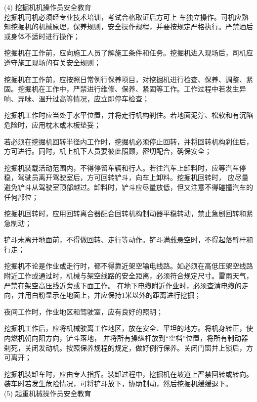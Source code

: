 (4) 挖掘机机操作员安全教育\\

 挖掘机司机必须经专业技术培训，考试合格取证后方可上
车独立操作。司机应熟知挖掘机的机械原理，保养规则，安全操作规程，并要按规定严格执行。严禁酒后或身体不适时进行操作；

 挖掘机在工作前，应向施工人员了解施工条件和任务。挖掘机进入现场后，司机应遵守施工现场的有关安全规则；

 挖掘机在工作前，应按照日常例行保养项目，对挖掘机进行检查、保养、调整、紧固。挖掘机在工作中，严禁进行维修、保养、紧固等工作。工作过程中若发生异响、异味、温升过高等情况，应立即停车检查；

 挖掘机工作时应当处于水平位置，并将走行机构刹住。若地面泥泞、松软和有沉陷危险时，应用枕木或木板垫妥；

 若必须在挖掘机回转半径内工作时，挖掘机必须停止回转，并将回转机构刹住后，方可进行。同时，机上机下人员要彼此照顾，密切配合，确保安全；

 挖掘机装载活动范围内，不得停留车辆和行人。若往汽车上卸料时，应等汽车停稳，驾驶员离开驾驶室后，方可回转铲斗，向车上卸料。挖掘机回转时，
应尽量避免铲斗从驾驶室顶部越过。卸料时，铲斗应尽量放低，但又注意不得碰撞汽车的任何部位；

 挖掘机回转时，应用回转离合器配合回转机构制动器平稳转动，禁止急剧回转和紧急制动；

 铲斗未离开地面前，不得做回转、走行等动作。铲斗满载悬空时，不得起落臂杆和行走；

 挖掘机不论是作业或走行时，都不得靠近架空输电线路。如必须在高低压架空线路附近工作或通过时，机械与架空线路的安全距离，必须符合规定尺寸。雷雨天气，严禁在架空高压线近旁或下面工作。
在地下电缆附近作业时，必须查清电缆的走向，并用白粉显示在地面上，并应保持1米以外的距离进行挖掘；

 夜间工作时，作业地区和驾驶室，应有良好的照明；

 挖掘机工作后，应将机械驶离工作地区，放在安全、平坦的地方。将机身转正，使内燃机朝向阳方向，铲斗落地，
并将所有操纵杆放到“空档”位置，将所有制动器刹死，关闭发动机。按照保养规程的规定，做好例行保养。关闭门窗并上锁后，方可离开；

 挖掘机装卸车时，应由专人指挥。装卸过程中，挖掘机在坡道上严禁回转或转向。装车时若发生危险情况，可将铲斗放下，协助制动，然后挖掘机缓缓退下。\\

(5) 起重机械操作员安全教育\\


